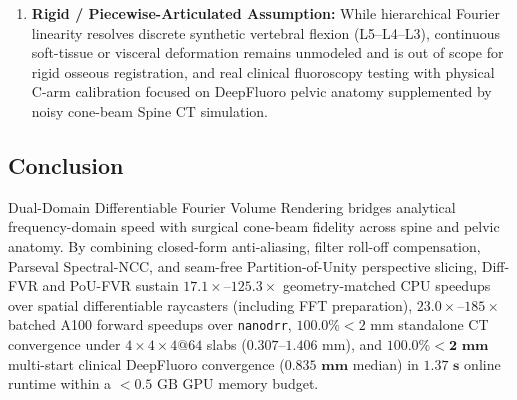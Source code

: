 \documentclass[journal,twoside,web]{ieeecolor}
\begin{document}
\begin{enumerate}
    \item \textbf{Rigid / Piecewise-Articulated Assumption:} While hierarchical Fourier linearity resolves discrete synthetic vertebral flexion (L5--L4--L3), continuous soft-tissue or visceral deformation remains unmodeled and is out of scope for rigid osseous registration, and real clinical fluoroscopy testing with physical C-arm calibration focused on DeepFluoro pelvic anatomy supplemented by noisy cone-beam Spine CT simulation.
\end{enumerate}

\subsection{Conclusion}
Dual-Domain Differentiable Fourier Volume Rendering bridges analytical frequency-domain speed with surgical cone-beam fidelity across spine and pelvic anatomy. By combining closed-form anti-aliasing, filter roll-off compensation, Parseval Spectral-NCC, and seam-free Partition-of-Unity perspective slicing, Diff-FVR and PoU-FVR sustain $17.1\times$--$125.3\times$ geometry-matched CPU speedups over spatial differentiable raycasters (including FFT preparation), $23.0\times$--$185\times$ batched A100 forward speedups over \texttt{nanodrr}, $100.0\% <2\text{ mm}$ standalone CT convergence under $4{\times}4{\times}4@64$ slabs ($0.307\text{--}1.406\text{ mm}$), and $\mathbf{100.0\% <2\text{ mm}}$ multi-start clinical DeepFluoro convergence ($\mathbf{0.835\text{ mm}}$ median) in $\mathbf{1.37\text{ s}}$ online runtime within a $<0.5\text{ GB}$ GPU memory budget.
\end{document}
